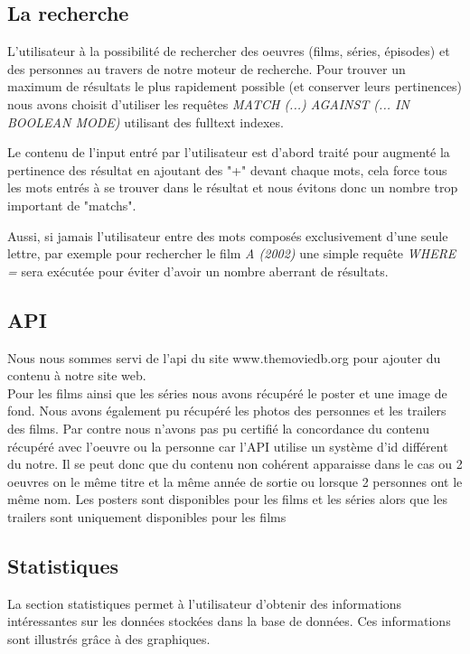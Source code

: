 \documentclass[10pt,a4paper]{article}
\begin{document}
\subsection{La recherche}

L'utilisateur à la possibilité de rechercher des oeuvres (films, séries, épisodes) et des personnes au travers de notre moteur de recherche. Pour trouver un maximum de résultats le plus rapidement possible (et conserver leurs pertinences) nous avons choisit d'utiliser les requêtes \textit{MATCH (...) AGAINST (... IN BOOLEAN MODE)} utilisant des fulltext indexes. 
\par 
Le contenu de l'input entré par l'utilisateur est d'abord traité pour augmenté la pertinence des résultat en ajoutant des "+" devant chaque mots, cela force tous les mots entrés à se trouver dans le résultat et nous évitons donc un nombre trop important de "matchs".
\par
Aussi, si jamais l'utilisateur entre des mots composés exclusivement d'une seule lettre, par exemple pour rechercher le film \textit{A (2002)} une simple requête \textit{WHERE = }
sera exécutée pour éviter d'avoir un nombre aberrant de résultats.

\subsection{API}
Nous nous sommes servi de l'api du site www.themoviedb.org pour ajouter du contenu à notre site web. \\
Pour les films ainsi que les séries nous avons récupéré le poster et une image de fond. Nous avons également pu récupéré les photos des personnes et les trailers des films. Par contre nous n'avons pas pu certifié la concordance du contenu récupéré avec l'oeuvre ou la personne car l'API utilise un système d'id différent du notre. Il se peut donc que du contenu non cohérent apparaisse dans le cas ou 2 oeuvres on le même titre et la même année de sortie ou lorsque 2 personnes ont le même nom. Les posters sont disponibles pour les films et les séries alors que les trailers sont uniquement disponibles pour les films

\newpage
\subsection{Statistiques}
La section statistiques permet à l'utilisateur d'obtenir des informations intéressantes sur les données stockées dans la base de données. Ces informations sont illustrés grâce à des graphiques. \\
\end{document}

